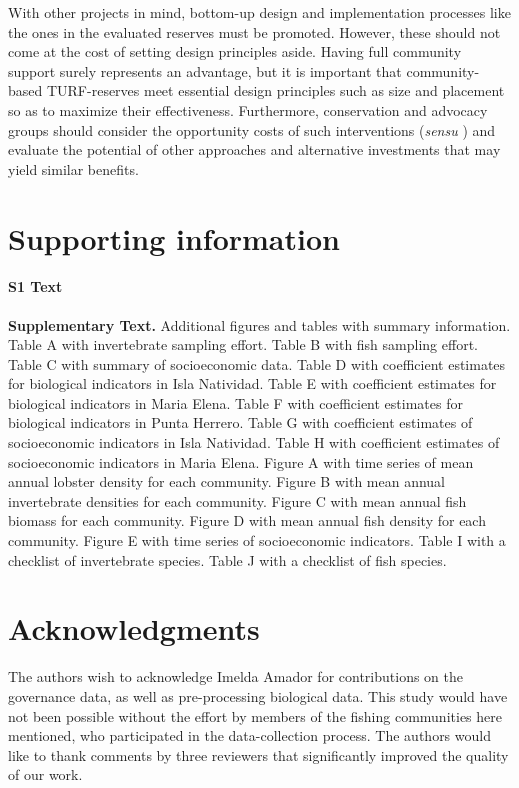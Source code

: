 \documentclass[10pt,letterpaper]{article}
\begin{document}
With other projects in mind, bottom-up design and implementation processes like the ones in the evaluated reserves must be promoted. However, these should not come at the cost of setting design principles aside. Having full community support surely represents an advantage, but it is important that community-based TURF-reserves meet essential design principles such as size and placement so as to maximize their effectiveness. Furthermore, conservation and advocacy groups should consider the opportunity costs of such interventions (\emph{sensu} \cite{smith_2010}) and evaluate the potential of other approaches and alternative investments that may yield similar benefits.

\section*{Supporting information}

\paragraph*{S1 Text}
\label{S1_Text}
{\bf Supplementary Text.} Additional figures and tables with summary information. Table A with invertebrate sampling effort. Table B with fish sampling effort. Table C with summary of socioeconomic data. Table D with coefficient estimates for biological indicators in Isla Natividad. Table E with coefficient estimates for biological indicators in Maria Elena. Table F with coefficient estimates for biological indicators in Punta Herrero. Table G with coefficient estimates of socioeconomic indicators in Isla Natividad. Table H with coefficient estimates of socioeconomic indicators in Maria Elena. Figure A with time series of mean annual lobster density for each community. Figure B with mean annual invertebrate densities for each community. Figure C with mean annual fish biomass for each community. Figure D with mean annual fish density for each community. Figure E with time series of socioeconomic indicators. Table I with a checklist of invertebrate species. Table J with a checklist of fish species.

\section*{Acknowledgments}

The authors wish to acknowledge Imelda Amador for contributions on the governance data, as well as pre-processing biological data. This study would have not been possible without the effort by members of the fishing communities here mentioned, who participated in the data-collection process. The authors would like to thank comments by three reviewers that significantly improved the quality of our work.
\end{document}
